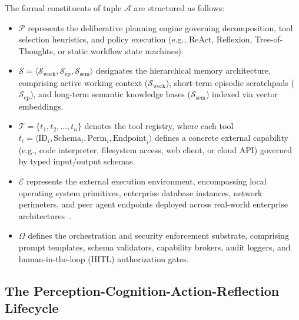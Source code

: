 The formal constituents of tuple $\mathcal{A}$ are structured as follows:
\begin{itemize}
    \item $\mathcal{P}$ represents the deliberative planning engine governing decomposition, tool selection heuristics, and policy execution (e.g., ReAct, Reflexion, Tree-of-Thoughts, or static workflow state machines).
    \item $\mathcal{S} = \langle \mathcal{S}_{\text{work}}, \mathcal{S}_{\text{ep}}, \mathcal{S}_{\text{sem}} \rangle$ designates the hierarchical memory architecture, comprising active working context ($\mathcal{S}_{\text{work}}$), short-term episodic scratchpads ($\mathcal{S}_{\text{ep}}$), and long-term semantic knowledge bases ($\mathcal{S}_{\text{sem}}$) indexed via vector embeddings.
    \item $\mathcal{T} = \{t_1, t_2, \dots, t_n\}$ denotes the tool registry, where each tool $t_i = \langle \text{ID}_i, \text{Schema}_i, \text{Perm}_i, \text{Endpoint}_i \rangle$ defines a concrete external capability (e.g., code interpreter, filesystem access, web client, or cloud API) governed by typed input/output schemas.
    \item $\mathcal{E}$ represents the external execution environment, encompassing local operating system primitives, enterprise database instances, network perimeters, and peer agent endpoints deployed across real-world enterprise architectures~\cite{sarferaz2025implementing, cruzes2026telemetry, khamis2025agentic}.
    \item $\Omega$ defines the orchestration and security enforcement substrate, comprising prompt templates, schema validators, capability brokers, audit loggers, and human-in-the-loop (HITL) authorization gates.
\end{itemize}

\subsection{The Perception-Cognition-Action-Reflection Lifecycle}
\label{subsec:lifecycle}

